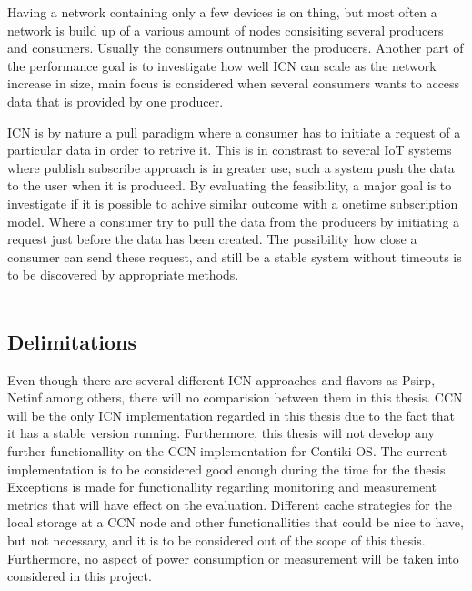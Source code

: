 Having a network containing only a few devices is on thing, but most often a network is build up of a various amount of nodes consisiting several producers and consumers. Usually the consumers outnumber the producers. Another part of the performance goal is to investigate how well ICN can scale as the network increase in size, main focus is considered when several consumers wants to access data that is provided by one producer.

ICN is by nature a pull paradigm where a consumer has to initiate a request of a particular data in order to retrive it. This is in constrast to several IoT systems where publish subscribe approach is in greater use, such a system push the data to the user when it is produced. By evaluating the feasibility, a major goal is to investigate if it is possible to achive similar outcome with a onetime subscription model. Where a consumer try to pull the data from the producers by initiating a request just before the data has been created. The possibility how close a consumer can send these request, and still be a stable system without timeouts is to be discovered by appropriate methods.
\\\\
\subsection{Delimitations}
Even though there are several different ICN approaches and flavors as Psirp, Netinf among others, there will no comparision between them in this thesis. CCN will be the only ICN implementation regarded in this thesis due to the fact that it has a stable version running. 
Furthermore, this thesis will not develop any further functionallity on the CCN implementation for Contiki-OS. The current implementation is to be considered good enough during the time for the thesis. Exceptions is made for functionallity regarding monitoring and measurement metrics that will have effect on the evaluation. Different cache strategies for the local storage at a CCN node and other functionallities that could be nice to have, but not necessary, and it is to be considered out of the scope of this thesis. Furthermore, no aspect of power consumption or measurement will be taken into considered in this project.


